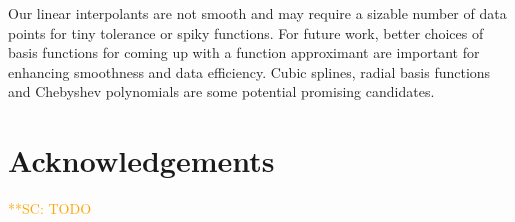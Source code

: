 \documentclass[review]{elsarticle}
\theoremstyle{definition}
\newcommand{\scnote}[1]{ {\textcolor{orange}  {\mbox{**SC:} #1}}}
\begin{document}
Our linear interpolants are not smooth and may require a sizable number of data
points for tiny tolerance or spiky functions. For future work, better choices of
basis functions for coming up with a function approximant are important for
enhancing smoothness and data efficiency. Cubic splines, radial basis functions
and Chebyshev polynomials are some potential promising candidates.



\section*{Acknowledgements}
\scnote{TODO}


\end{document}
